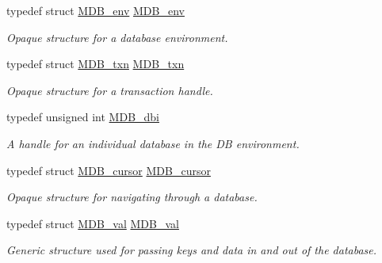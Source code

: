 \begin{DoxyCompactItemize}
\item 
typedef struct \mbox{\hyperlink{struct_m_d_b__env}{M\+D\+B\+\_\+env}} \mbox{\hyperlink{group__mdb_ga265e83b041e875e14deb7b597e07d9ab}{M\+D\+B\+\_\+env}}
\begin{DoxyCompactList}\small\item\em Opaque structure for a database environment. \end{DoxyCompactList}\item 
typedef struct \mbox{\hyperlink{struct_m_d_b__txn}{M\+D\+B\+\_\+txn}} \mbox{\hyperlink{group__mdb_ga3e1db36dac9468d7517567da4653c645}{M\+D\+B\+\_\+txn}}
\begin{DoxyCompactList}\small\item\em Opaque structure for a transaction handle. \end{DoxyCompactList}\item 
\mbox{\label{group__mdb_gadbe68a06c448dfb62da16443d251a78b}} 
typedef unsigned int \mbox{\hyperlink{group__mdb_gadbe68a06c448dfb62da16443d251a78b}{M\+D\+B\+\_\+dbi}}
\begin{DoxyCompactList}\small\item\em A handle for an individual database in the DB environment. \end{DoxyCompactList}\item 
\mbox{\label{group__mdb_gaf48cc601fde5137372077852187bf596}} 
typedef struct \mbox{\hyperlink{struct_m_d_b__cursor}{M\+D\+B\+\_\+cursor}} \mbox{\hyperlink{group__mdb_gaf48cc601fde5137372077852187bf596}{M\+D\+B\+\_\+cursor}}
\begin{DoxyCompactList}\small\item\em Opaque structure for navigating through a database. \end{DoxyCompactList}\item 
typedef struct \mbox{\hyperlink{struct_m_d_b__val}{M\+D\+B\+\_\+val}} \mbox{\hyperlink{group__mdb_gadbf837292dc74689b20df5937fddc96c}{M\+D\+B\+\_\+val}}
\begin{DoxyCompactList}\small\item\em Generic structure used for passing keys and data in and out of the database. \end{DoxyCompactList}\item 
\mbox{\label{group__mdb_gac1ea382293d1da331ab88ca59052847d}} 

\end{DoxyCompactItemize}
